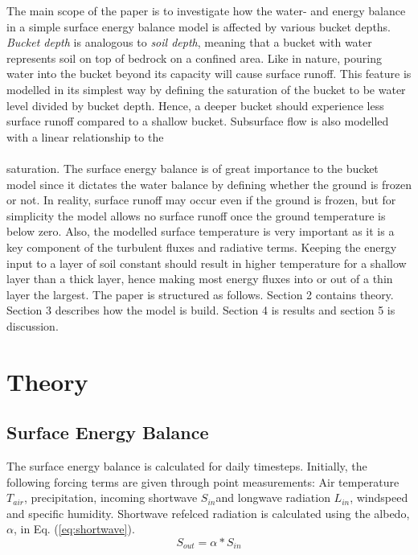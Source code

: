 \documentclass[a4paper,11pt,twocolumn]{article}
\begin{document}
The main scope of the paper is to investigate how the water- and energy balance in a simple surface energy balance model is affected by various bucket depths. \textit{Bucket depth} is analogous to \textit{soil depth}, meaning that a bucket with water represents soil on top of bedrock on a confined area. Like in nature, pouring water into the bucket beyond its capacity will cause surface runoff. This feature is modelled in its simplest way by defining the saturation of the bucket to be water level divided by bucket depth. Hence, a deeper bucket should experience less surface runoff compared to a shallow bucket. Subsurface flow is also modelled with a linear relationship to the 
\\
\\
saturation. The surface energy balance 
is of great importance to the bucket model since it dictates the water balance by defining whether the ground is frozen or not. In reality, surface runoff may occur even if the ground is frozen, but for simplicity the model allows no surface runoff once the ground temperature is below zero. Also, the modelled surface temperature is very important as it is a key component of the turbulent fluxes and radiative terms. Keeping the energy input to a layer of soil constant should result in higher temperature for a shallow layer than a thick layer, hence making most energy fluxes into or out of a thin layer the largest. 
The paper is structured as follows. Section 2 contains theory. Section 3 describes how the model is build. Section 4 is results and section 5 is discussion. 
\
\section{Theory}


\subsection{Surface Energy Balance}

The surface energy balance is calculated for daily timesteps. Initially, the following forcing terms are given through point  measurements: Air temperature $T_{air}$, precipitation, incoming shortwave $S_{in} $and longwave radiation $L_{in}$, windspeed and specific humidity.
Shortwave refelced radiation is calculated using the albedo, $\alpha$, in Eq. (\ref{eq:shortwave}).
\begin{equation}
	S_{out} = \alpha * S_{in}
	\label{eq:shortwave}
\end{equation}
\end{document}
